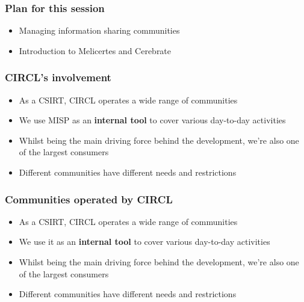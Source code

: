 
\begin{frame}[t,plain]
\titlepage
\end{frame}

\begin{frame}
	\frametitle{Plan for this session}
	\begin{itemize}
		\item Managing information sharing communities
                \item Introduction to Melicertes and Cerebrate
	\end{itemize}
\end{frame}

\begin{frame}
\frametitle{CIRCL's involvement}
\begin{itemize}
        \item As a CSIRT, CIRCL operates a wide range of communities
        \item We use MISP as an {\bf internal tool} to cover various day-to-day activities
        \item Whilst being the main driving force behind the development, we're also one of the largest consumers
	\item Different communities have different needs and restrictions
\end{itemize}
\end{frame}

\begin{frame}
\frametitle{Communities operated by CIRCL}
\begin{itemize}
        \item As a CSIRT, CIRCL operates a wide range of communities
        \item We use it as an {\bf internal tool} to cover various day-to-day activities
        \item Whilst being the main driving force behind the development, we're also one of the largest consumers
	\item Different communities have different needs and restrictions
\end{itemize}
\end{frame}


